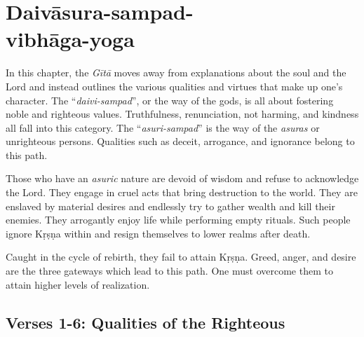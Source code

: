 \chapter{Daivāsura-sampad-\\vibhāga-yoga}\label{chap-daivasura-sampad-vibhaga-yoga}
\noindent In this chapter, the \textit{Gītā} moves away from explanations about the soul and the Lord and instead outlines the various qualities and virtues that make up one’s character. The \enquote{\textit{daivi-sampad}}, or the way of the gods, is all about fostering noble and righteous values. Truthfulness, renunciation, not harming, and kindness all fall into this category. The \enquote{\textit{asuri-sampad}} is the way of the \textit{asuras} or unrighteous persons. Qualities such as deceit, arrogance, and ignorance belong to this path.

Those who have an \textit{asuric} nature are devoid of wisdom and refuse to acknowledge the Lord. They engage in cruel acts that bring destruction to the world. They are enslaved by material desires and endlessly try to gather wealth and kill their enemies. They arrogantly enjoy life while performing empty rituals. Such people ignore Kṛṣṇa within and resign themselves to lower realms after death.

Caught in the cycle of rebirth, they fail to attain Kṛṣṇa. Greed, anger, and desire are the three gateways which lead to this path. One must overcome them to attain higher levels of realization.

\section{Verses 1-6: Qualities of the Righteous}\label{sec-verses-1-6-qualities-of-the-righteous}


